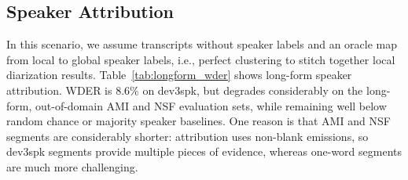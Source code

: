 \subsection{Speaker Attribution}
In this scenario, we assume transcripts without speaker labels and an oracle map from local to global speaker labels, i.e., perfect clustering to stitch together local diarization results. Table~\ref{tab:longform_wder} shows long-form speaker attribution. WDER is 8.6\% on dev3spk, but degrades considerably on the long-form, out-of-domain AMI and NSF evaluation sets, while remaining well below random chance or majority speaker baselines. One reason is that AMI and NSF segments are considerably shorter: attribution uses non-blank emissions, so dev3spk segments provide multiple pieces of evidence, whereas one-word segments are much more challenging.
\vspace{-2mm}
%
%
%
%
%
%
%